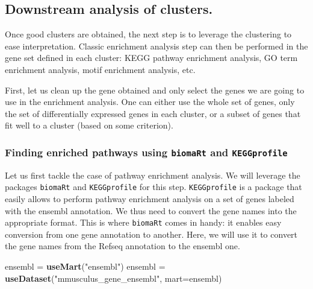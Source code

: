 \documentclass[9pt,a4paper,]{extarticle}
\newenvironment{Shaded}{\begin{snugshade}}{\end{snugshade}}
\newcommand{\DataTypeTok}[1]{\textcolor[rgb]{0.13,0.29,0.53}{#1}}
\newcommand{\KeywordTok}[1]{\textcolor[rgb]{0.13,0.29,0.53}{\textbf{#1}}}
\newcommand{\NormalTok}[1]{#1}
\newcommand{\StringTok}[1]{\textcolor[rgb]{0.31,0.60,0.02}{#1}}
\begin{document}
\hypertarget{downstream-analysis-of-clusters.}{%
\subsection{Downstream analysis of clusters.}\label{downstream-analysis-of-clusters.}}

Once good clusters are obtained, the next step is to leverage the clustering
to ease interpretation. Classic enrichment analysis step can then be performed
in the gene set defined in each cluster: KEGG pathway enrichment analysis, GO
term enrichment analysis, motif enrichment analysis, etc.

First, let us clean up the gene obtained and only select the genes we are
going to use in the enrichment analysis. One can either use the whole set of
genes, only the set of differentially expressed genes in each cluster, or a
subset of genes that fit well to a cluster (based on some criterion).

\hypertarget{finding-enriched-pathways-using-biomart-and-keggprofile}{%
\subsubsection{\texorpdfstring{Finding enriched pathways using \texttt{biomaRt} and \texttt{KEGGprofile}}{Finding enriched pathways using biomaRt and KEGGprofile}}\label{finding-enriched-pathways-using-biomart-and-keggprofile}}

Let us first tackle the case of pathway enrichment analysis. We will leverage
the packages \texttt{biomaRt} \citep{durinck:biomart} and \texttt{KEGGprofile} \citep{zhao:keggprofile}
for this step. \texttt{KEGGprofile} is a
package that easily allows to perform pathway enrichment analysis on a set of
genes labeled with the ensembl annotation. We thus need to convert the gene
names into the appropriate format. This is where \texttt{biomaRt} comes in handy: it
enables easy conversion from one gene annotation to another. Here, we will use
it to convert the gene names from the Refseq annotation to the ensembl one.

\begin{Shaded}
\begin{Highlighting}[]
\NormalTok{ensembl =}\StringTok{ }\KeywordTok{useMart}\NormalTok{(}\StringTok{"ensembl"}\NormalTok{)}
\NormalTok{ensembl =}\StringTok{ }\KeywordTok{useDataset}\NormalTok{(}\StringTok{"mmusculus_gene_ensembl"}\NormalTok{, }\DataTypeTok{mart=}\NormalTok{ensembl)}
\end{Highlighting}
\end{Shaded}
\end{document}
